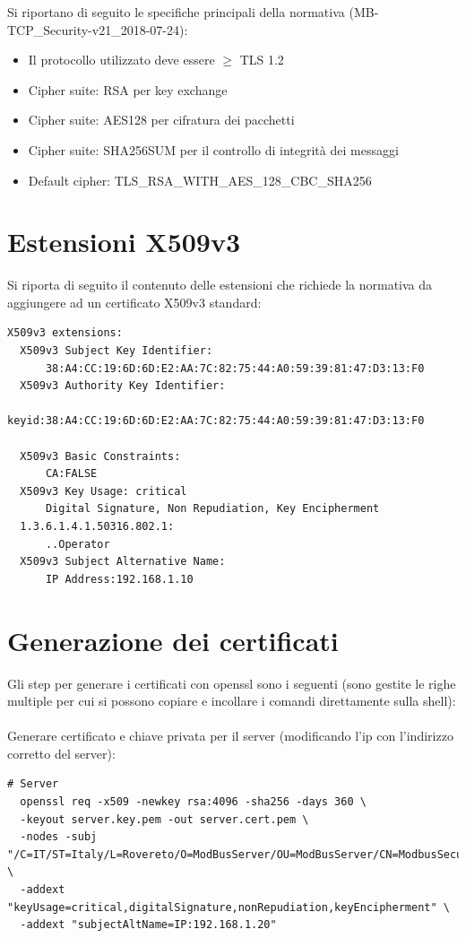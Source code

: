 Si riportano di seguito le specifiche principali della normativa (MB-TCP\_Security-v21\_2018-07-24):

\begin{itemize}
    \item Il protocollo utilizzato deve essere $\ge$ TLS 1.2
    \item Cipher suite: RSA per key exchange
    \item Cipher suite: AES128 per cifratura dei pacchetti
    \item Cipher suite: SHA256SUM per il controllo di integrità dei messaggi
    \item Default cipher: TLS\_RSA\_WITH\_AES\_128\_CBC\_SHA256
\end{itemize}

\section{Estensioni X509v3}

Si riporta di seguito il contenuto delle estensioni che richiede la normativa 
da aggiungere ad un certificato X509v3 standard:

\begin{verbatim}
X509v3 extensions:
  X509v3 Subject Key Identifier:
      38:A4:CC:19:6D:6D:E2:AA:7C:82:75:44:A0:59:39:81:47:D3:13:F0
  X509v3 Authority Key Identifier:
      keyid:38:A4:CC:19:6D:6D:E2:AA:7C:82:75:44:A0:59:39:81:47:D3:13:F0

  X509v3 Basic Constraints:
      CA:FALSE
  X509v3 Key Usage: critical
      Digital Signature, Non Repudiation, Key Encipherment
  1.3.6.1.4.1.50316.802.1:
      ..Operator
  X509v3 Subject Alternative Name:
      IP Address:192.168.1.10
\end{verbatim}

\newpage
\section{Generazione dei certificati}

Gli step per generare i certificati con openssl 
sono i seguenti (sono gestite le righe multiple per cui si 
possono copiare e incollare i comandi direttamente sulla shell):
\\\\
Generare certificato e chiave privata per il server (modificando l'ip con l'indirizzo corretto del server):

\begin{verbatim}
# Server
  openssl req -x509 -newkey rsa:4096 -sha256 -days 360 \
  -keyout server.key.pem -out server.cert.pem \
  -nodes -subj "/C=IT/ST=Italy/L=Rovereto/O=ModBusServer/OU=ModBusServer/CN=ModbusSecurityServer" \
  -addext "keyUsage=critical,digitalSignature,nonRepudiation,keyEncipherment" \
  -addext "subjectAltName=IP:192.168.1.20"
\end{verbatim}

